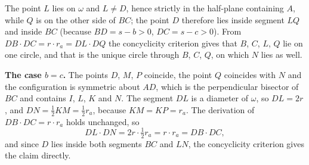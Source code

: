 {    The point $L$ lies on $\omega$ and $L \neq D$, hence strictly in the half-plane containing $A$, while $Q$ is on the other side of $BC$; the point $D$ therefore lies inside segment $LQ$ and inside $BC$ (because $BD = s-b > 0$, $DC = s-c > 0$). From $DB \cdot DC = r \cdot r_a = DL \cdot DQ$ the concyclicity criterion gives that $B$, $C$, $L$, $Q$ lie on one circle, and that is the unique circle through $B$, $C$, $Q$, on which $N$ lies as well.

    \textbf{The case $b=c$.} The points $D$, $M$, $P$ coincide, the point $Q$ coincides with $N$ and the configuration is symmetric about $AD$, which is the perpendicular bisector of $BC$ and contains $I$, $L$, $K$ and $N$. The segment $DL$ is a diameter of $\omega$, so $DL = 2r$, and $DN = \tfrac12 KM = \tfrac12 r_a$, because $KM = KP = r_a$. The derivation of $DB \cdot DC = r \cdot r_a$ holds unchanged, so
    $$
    DL \cdot DN = 2r \cdot \tfrac12 r_a = r \cdot r_a = DB \cdot DC,
    $$
    and since $D$ lies inside both segments $BC$ and $LN$, the concyclicity criterion gives the claim directly.
}

